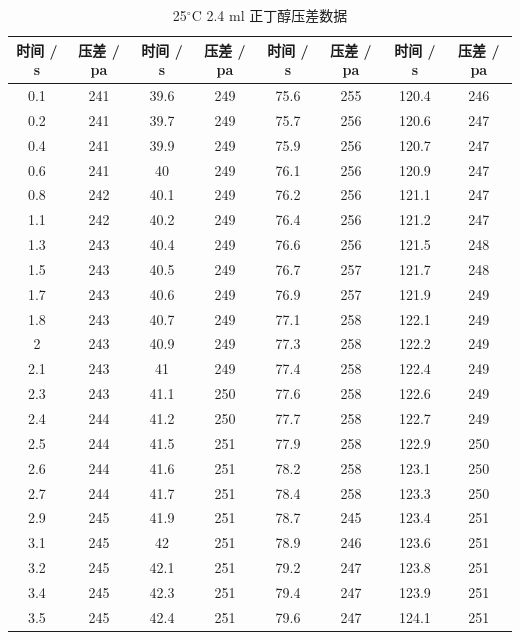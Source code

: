 \documentclass[12pt]{ctexart}
\numberwithin{equation}{section}
\begin{document}
\begin{longtable}{cc|cc|cc|cc}
    \caption{25$^\circ$C  2.4 ml 正丁醇压差数据} \\
    \hline
    时间 / s & 压差 / pa & 时间 / s & 压差 / pa & 时间 / s & 压差 / pa & 时间 / s & 压差 / pa \\
    \hline
    0.1  &  241  &  39.6  &  249  &  75.6  &  255  &  120.4  &  246  \\
0.2  &  241  &  39.7  &  249  &  75.7  &  256  &  120.6  &  247  \\
0.4  &  241  &  39.9  &  249  &  75.9  &  256  &  120.7  &  247  \\
0.6  &  241  &  40  &  249  &  76.1  &  256  &  120.9  &  247  \\
0.8  &  242  &  40.1  &  249  &  76.2  &  256  &  121.1  &  247  \\
1.1  &  242  &  40.2  &  249  &  76.4  &  256  &  121.2  &  247  \\
1.3  &  243  &  40.4  &  249  &  76.6  &  256  &  121.5  &  248  \\
1.5  &  243  &  40.5  &  249  &  76.7  &  257  &  121.7  &  248  \\
1.7  &  243  &  40.6  &  249  &  76.9  &  257  &  121.9  &  249  \\
1.8  &  243  &  40.7  &  249  &  77.1  &  258  &  122.1  &  249  \\
2  &  243  &  40.9  &  249  &  77.3  &  258  &  122.2  &  249  \\
2.1  &  243  &  41  &  249  &  77.4  &  258  &  122.4  &  249  \\
2.3  &  243  &  41.1  &  250  &  77.6  &  258  &  122.6  &  249  \\
2.4  &  244  &  41.2  &  250  &  77.7  &  258  &  122.7  &  249  \\
2.5  &  244  &  41.5  &  251  &  77.9  &  258  &  122.9  &  250  \\
2.6  &  244  &  41.6  &  251  &  78.2  &  258  &  123.1  &  250  \\
2.7  &  244  &  41.7  &  251  &  78.4  &  258  &  123.3  &  250  \\
2.9  &  245  &  41.9  &  251  &  78.7  &  245  &  123.4  &  251  \\
3.1  &  245  &  42  &  251  &  78.9  &  246  &  123.6  &  251  \\
3.2  &  245  &  42.1  &  251  &  79.2  &  247  &  123.8  &  251  \\
3.4  &  245  &  42.3  &  251  &  79.4  &  247  &  123.9  &  251  \\
3.5  &  245  &  42.4  &  251  &  79.6  &  247  &  124.1  &  251  \\

\end{longtable}
\end{document}
